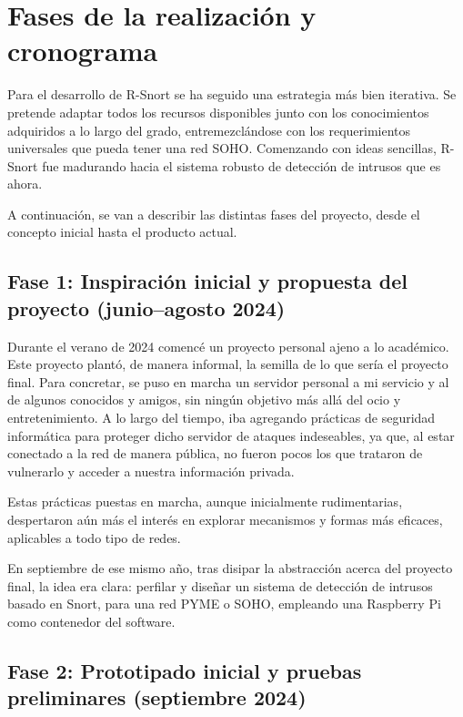 \documentclass[12pt,a4paper]{report}
\begin{document}
\chapter{Fases de la realización y cronograma}

Para el desarrollo de R-Snort se ha seguido una estrategia más bien iterativa. Se pretende adaptar todos los recursos disponibles junto con los conocimientos adquiridos a lo largo del grado, entremezclándose con los requerimientos universales que pueda tener una red SOHO. Comenzando con ideas sencillas, R-Snort fue madurando hacia el sistema robusto de detección de intrusos que es ahora.\newline

A continuación, se van a describir las distintas fases del proyecto, desde el concepto inicial hasta el producto actual.

\section{Fase 1: Inspiración inicial y propuesta del proyecto (junio–agosto 2024)}

Durante el verano de 2024 comencé un proyecto personal ajeno a lo académico. Este proyecto plantó, de manera informal, la semilla de lo que sería el proyecto final. Para concretar, se puso en marcha un servidor personal a mi servicio y al de algunos conocidos y amigos, sin ningún objetivo más allá del ocio y entretenimiento. A lo largo del tiempo, iba agregando prácticas de seguridad informática para proteger dicho servidor de ataques indeseables, ya que, al estar conectado a la red de manera pública, no fueron pocos los que trataron de vulnerarlo y acceder a nuestra información privada.\newline

Estas prácticas puestas en marcha, aunque inicialmente rudimentarias, despertaron aún más el interés en explorar mecanismos y formas más eficaces, aplicables a todo tipo de redes.\newline

En septiembre de ese mismo año, tras disipar la abstracción acerca del proyecto final, la idea era clara: perfilar y diseñar un sistema de detección de intrusos basado en Snort, para una red PYME o SOHO, empleando una Raspberry Pi como contenedor del software.

\section{Fase 2: Prototipado inicial y pruebas preliminares (septiembre 2024)}
\end{document}
